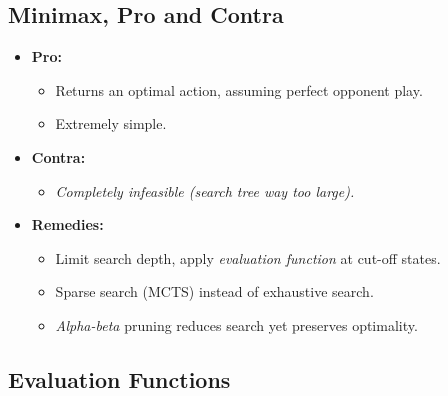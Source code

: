 \documentclass[conference]{styles/acmsiggraph}
\begin{document}
    \subsection{Minimax, Pro and Contra}
        \begin{itemize}
            \item \textbf{Pro:}
                \begin{itemize}
                    \item Returns an optimal action, assuming perfect opponent play.
                    \item Extremely simple.
                \end{itemize}
            \item \textbf{Contra:}
                \begin{itemize}
                    \item \textit{Completely infeasible (search tree way too large).}
                \end{itemize}
            \item \textbf{Remedies:}
                \begin{itemize}
                    \item Limit search depth, apply \textit{evaluation function} at cut-off states.
                    \item Sparse search (MCTS) instead of exhaustive search.
                    \item \textit{Alpha-beta} pruning reduces search yet preserves optimality.
                \end{itemize}
        \end{itemize}
    
    
    
    
    
    
    
    
    
    
    
    \subsection{Evaluation Functions}
\end{document}
